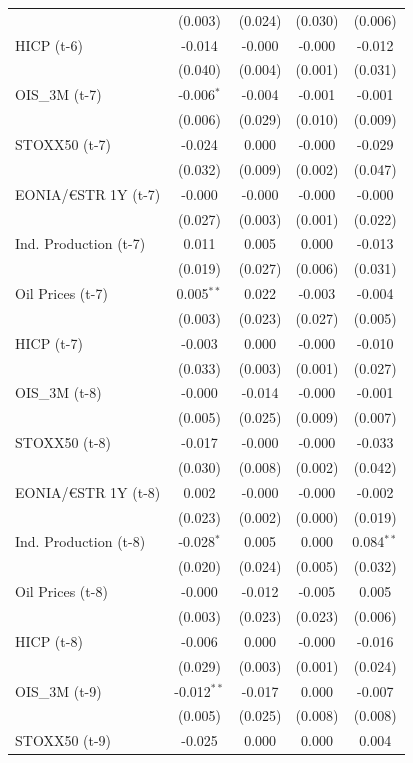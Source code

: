 \begin{longtable}[t]{lcccc}
 & (0.003) & (0.024) & (0.030) & (0.006)\\
HICP (t-6) & -0.014 & -0.000 & -0.000 & -0.012\\
 & (0.040) & (0.004) & (0.001) & (0.031)\\
OIS\_3M (t-7) & -0.006$^{*}$ & -0.004 & -0.001 & -0.001\\
 & (0.006) & (0.029) & (0.010) & (0.009)\\
STOXX50 (t-7) & -0.024 & 0.000 & -0.000 & -0.029\\
 & (0.032) & (0.009) & (0.002) & (0.047)\\
EONIA/€STR 1Y (t-7) & -0.000 & -0.000 & -0.000 & -0.000\\
 & (0.027) & (0.003) & (0.001) & (0.022)\\
Ind. Production (t-7) & 0.011 & 0.005 & 0.000 & -0.013\\
 & (0.019) & (0.027) & (0.006) & (0.031)\\
Oil Prices (t-7) & 0.005$^{**}$ & 0.022 & -0.003 & -0.004\\
 & (0.003) & (0.023) & (0.027) & (0.005)\\
HICP (t-7) & -0.003 & 0.000 & -0.000 & -0.010\\
 & (0.033) & (0.003) & (0.001) & (0.027)\\
OIS\_3M (t-8) & -0.000 & -0.014 & -0.000 & -0.001\\
 & (0.005) & (0.025) & (0.009) & (0.007)\\
STOXX50 (t-8) & -0.017 & -0.000 & -0.000 & -0.033\\
 & (0.030) & (0.008) & (0.002) & (0.042)\\
EONIA/€STR 1Y (t-8) & 0.002 & -0.000 & -0.000 & -0.002\\
 & (0.023) & (0.002) & (0.000) & (0.019)\\
Ind. Production (t-8) & -0.028$^{*}$ & 0.005 & 0.000 & 0.084$^{**}$\\
 & (0.020) & (0.024) & (0.005) & (0.032)\\
Oil Prices (t-8) & -0.000 & -0.012 & -0.005 & 0.005\\
 & (0.003) & (0.023) & (0.023) & (0.006)\\
HICP (t-8) & -0.006 & 0.000 & -0.000 & -0.016\\
 & (0.029) & (0.003) & (0.001) & (0.024)\\
OIS\_3M (t-9) & -0.012$^{**}$ & -0.017 & 0.000 & -0.007\\
 & (0.005) & (0.025) & (0.008) & (0.008)\\
STOXX50 (t-9) & -0.025 & 0.000 & 0.000 & 0.004\\

\end{longtable}
